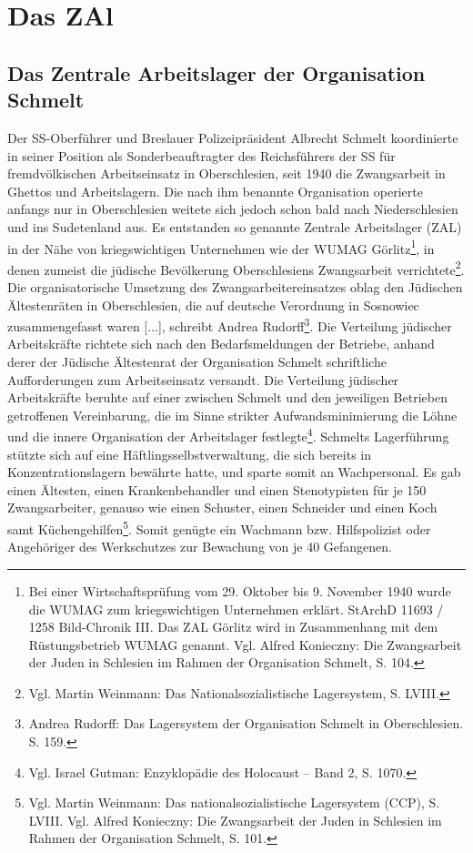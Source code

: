 \section{Das ZAl}
\subsection{Das Zentrale Arbeitslager der Organisation Schmelt}
Der SS-Oberführer und Breslauer Polizeipräsident Albrecht Schmelt koordinierte in seiner Position als \glqq Sonderbeauftragter des Reichsführers der SS für fremdvölkischen Arbeitseinsatz in Oberschlesien\grqq, seit 1940 die Zwangsarbeit in Ghettos und Arbeitslagern. Die nach ihm benannte Organisation operierte anfangs nur in Oberschlesien weitete sich jedoch schon bald nach Niederschlesien und ins Sudetenland aus. Es entstanden so genannte Zentrale Arbeitslager (ZAL) in der Nähe von kriegswichtigen Unternehmen wie der WUMAG Görlitz\footnote{Bei einer Wirtschaftsprüfung vom 29. Oktober bis 9. November 1940 wurde die WUMAG zum kriegswichtigen Unternehmen erklärt. StArchD 11693 / 1258 Bild-Chronik III. Das ZAL Görlitz wird in Zusammenhang mit dem Rüstungsbetrieb WUMAG genannt. Vgl. Alfred Konieczny: Die Zwangsarbeit der Juden in Schlesien im Rahmen der Organisation Schmelt, S. 104.}, in denen zumeist die jüdische Bevölkerung Oberschlesiens Zwangsarbeit verrichtete\footnote{Vgl. Martin Weinmann: Das Nationalsozialistische Lagersystem, S. LVIII.}. \glqq Die organisatorische Umsetzung des Zwangsarbeitereinsatzes oblag den Jüdischen Ältestenräten in Oberschlesien, die auf deutsche Verordnung in Sosnowiec zusammengefasst waren [...]\grqq, schreibt Andrea Rudorff\footnote{Andrea Rudorff: Das Lagersystem der Organisation Schmelt in Oberschlesien. S. 159.}. Die Verteilung jüdischer Arbeitskräfte richtete sich nach den Bedarfsmeldungen der Betriebe, anhand derer der Jüdische Ältestenrat der Organisation Schmelt schriftliche Aufforderungen zum Arbeitseinsatz versandt. Die Verteilung jüdischer Arbeitskräfte beruhte auf einer zwischen Schmelt und den jeweiligen Betrieben getroffenen Vereinbarung, die im Sinne strikter Aufwandsminimierung die Löhne und die innere Organisation der Arbeitslager festlegte\footnote{Vgl. Israel Gutman: Enzyklopädie des Holocaust -- Band 2, S. 1070.}. Schmelts Lagerführung stützte sich auf eine Häftlingsselbstverwaltung, die sich bereits in Konzentrationslagern bewährte hatte, und sparte somit an Wachpersonal. Es gab einen Ältesten, einen Krankenbehandler und einen Stenotypisten für je 150 Zwangsarbeiter, genauso wie einen Schuster, einen Schneider und einen Koch samt Küchengehilfen\footnote{Vgl. Martin Weinmann: Das nationalsozialistische Lagersystem (CCP), S. LVIII. Vgl. Alfred Konieczny: Die Zwangsarbeit der Juden in Schlesien im Rahmen der Organisation Schmelt, S. 101.}. Somit genügte ein Wachmann bzw. Hilfspolizist oder Angehöriger des Werkschutzes zur Bewachung von je 40 Gefangenen.

